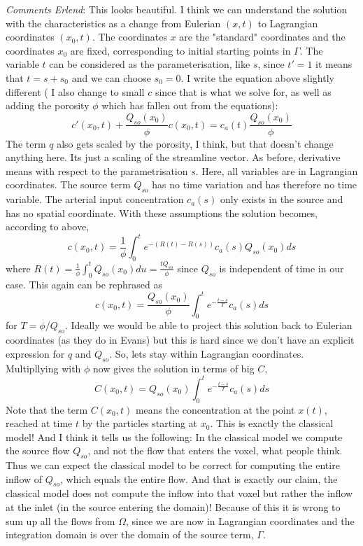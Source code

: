 \documentclass[paper=a4, fontsize=12pt,parskip=half,draft,headings=small]{scrartcl}
\begin{document}
		\textit{Comments Erlend}: This looks beautiful. I think we can understand the solution with the characteristics as a change from Eulerian $(x,t)$ to Lagrangian coordinates $(x_0,t)$. The coordinates $x$ are the "standard" coordinates and the coordinates $x_0$ are fixed, corresponding to initial starting points in $\Gamma$. The variable $t$ can be considered as the parameterisation, like $s$, since $t' = 1$ it means that $t  = s + s_0$ and we can choose $s_0 = 0$. I write the equation above slightly different ( I also change to small $c$ since that is what we solve for, as well as adding the porosity $\phi$ which has fallen out from the equations):
		$$
		c'(x_0,t) + \frac{Q_{so}(x_0)}{\phi}c(x_0,t) = c_a(t)\frac{Q_{so}(x_0)}{\phi}
		$$
		The term $q$ also gets scaled by the porosity, I think, but that doesn't change anything here. Its just a scaling of the streamline vector.
		As before, derivative means with respect to the parametrisation $s$. Here, all variables are in Lagrangian coordinates. The source term $Q_{so}$ has no time variation and has therefore no time variable. The arterial input concentration $c_a(s)$ only exists in the source and has no spatial coordinate. With these assumptions the solution becomes, according to above,
		$$
		c(x_0,t) = \frac{1}{\phi}\int_0^{t}e^{-(R(t) - R(s))}c_a(s)Q_{so}(x_0)ds
		$$
		where $R(t) = \frac{1}{\phi}\int_0^t Q_{so}(x_0)du = \frac{tQ_{so}}{\phi}$ since $Q_{so}$ is independent of time in our case. This again can be rephrased as
		$$
		c(x_0,t) = \frac{Q_{so}(x_0)}{\phi}\int_0^{t}e^{-\frac{t-s}{T}}c_a(s)ds
		$$
		for $T = \phi/Q_{so}$. Ideally we would be able to project this solution back to Eulerian coordinates (as they do in Evans) but this is hard since we don't have an explicit expression for $q$ and $Q_{so}$. So, lets stay within Lagrangian coordinates. Multipllying with $\phi$ now gives the solution in terms of big $C$,
		$$
		C(x_0,t) = Q_{so}(x_0)\int_0^{t}e^{-\frac{t-s}{T}}c_a(s)ds
		$$
		Note that the term $C(x_0,t)$ means the concentration at the point $x(t)$, reached at time $t$ by the particles starting at $x_0$.
		This is exactly the classical model! And I think it tells us the following: In the classical model we compute the source flow $Q_{so}$, and not the flow that enters the voxel, what people think. Thus we can expect the classical model to be correct for computing the entire inflow of $Q_{so}$, which equals the entire flow. And that is exactly our claim, the classical model does not compute the inflow into that voxel but rather the inflow at the inlet (in the source entering the domain)! Because of this it is wrong to sum up all the flows from $\Omega$, since we are now in Lagrangian coordinates and the integration domain is over the domain of the source term, $\Gamma$.
\end{document}
